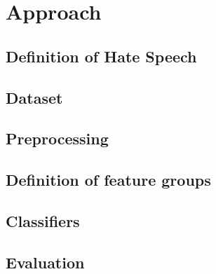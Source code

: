 \section{Approach} \label{approach}

\subsection{Definition of Hate Speech}

\subsection{Dataset}

\subsection{Preprocessing}

\subsection{Definition of feature groups}

\subsection{Classifiers}

\subsection{Evaluation}